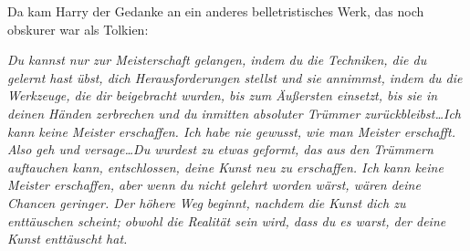 Da kam Harry der Gedanke an ein anderes belletristisches Werk, das noch obskurer war als Tolkien:

\emph{Du kannst nur zur Meisterschaft gelangen, indem du die Techniken, die du gelernt hast übst, dich Herausforderungen stellst und sie annimmst, indem du die Werkzeuge, die dir beigebracht wurden, bis zum Äußersten einsetzt, bis sie in deinen Händen zerbrechen und du inmitten absoluter Trümmer zurückbleibst…Ich kann keine Meister erschaffen. Ich habe nie gewusst, wie man Meister erschafft. Also geh und versage…Du wurdest zu etwas geformt, das aus den Trümmern auftauchen kann, entschlossen, deine Kunst neu zu erschaffen. Ich kann keine Meister erschaffen, aber wenn du nicht gelehrt worden wärst, wären deine Chancen geringer. Der höhere Weg beginnt, nachdem die Kunst dich zu enttäuschen scheint; obwohl die Realität sein wird, dass du es warst, der deine Kunst enttäuscht hat.}

